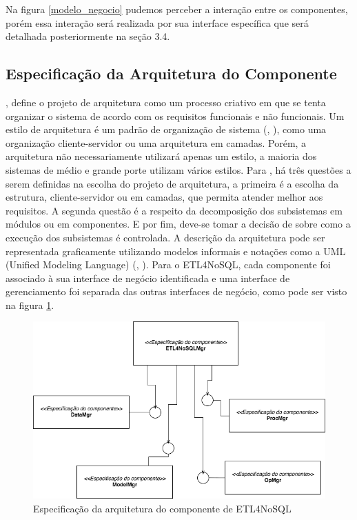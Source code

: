 Na figura \ref{modelo_negocio} pudemos perceber a interação entre os componentes, porém essa interação será realizada por sua interface específica que será detalhada posteriormente na seção 3.4.

\subsection{Especificação da Arquitetura do Componente}

\cite{sommerville:2013}, define o projeto de arquitetura como um processo criativo em que se tenta organizar o sistema de acordo com os requisitos funcionais e não funcionais. Um estilo de arquitetura é um padrão de organização de sistema (\cite{shaw:1996}, \cite{sommerville:2013}), como uma organização cliente-servidor ou uma arquitetura em camadas. Porém, a arquitetura não necessariamente utilizará apenas um estilo, a maioria dos sistemas de médio e grande porte utilizam vários estilos. Para \cite{shaw:1996}, há três questões a serem definidas na escolha do projeto de arquitetura, a primeira é a escolha da estrutura, cliente-servidor ou em camadas, que permita atender melhor aos requisitos. A segunda questão é a respeito da decomposição dos subsistemas em módulos ou em componentes. E por fim, deve-se tomar a decisão de sobre como a execução dos subsistemas é controlada. A descrição da arquitetura pode ser representada graficamente utilizando modelos informais e notações como a UML (Unified Modeling Language) (\cite{clements:2002}, \cite{sommerville:2013}). Para o ETL4NoSQL, cada componente foi associado à sua interface de negócio identificada e uma interface de gerenciamento foi separada das outras interfaces de negócio, como pode ser visto na figura \ref{arquitetura}.

\begin{figure}[h]
	\centering
	\includegraphics[scale=0.5]{fig/arquitetura_comp.png}
	\caption{Especificação da arquitetura do componente de ETL4NoSQL}
	\label{arquitetura}
\end{figure}

